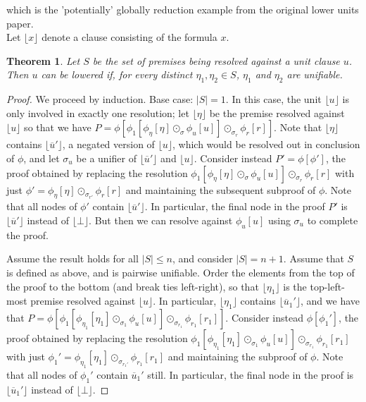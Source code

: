 \documentclass[12pt]{article}
\newtheorem{thm}{Theorem}[section]
\theoremstyle{definition}
\theoremstyle{remark}
\newcommand{\clause}[1]{ \lfloor{#1} \rfloor}
\begin{document}
which is the 'potentially' globally reduction example from the original lower units paper.\\


\newpage
Let $\clause{x}$ denote a clause consisting of the formula $x$.

\begin{thm}
Let $S$ be the set of premises being resolved against a unit clause $u$. Then $u$ can be lowered if, for every distinct $\eta_1,\eta_2 \in S$, $\eta_1$ and $\eta_2$ are unifiable.
\end{thm}

\begin{proof}
We proceed by induction. Base case: $|S|=1$. In this case, the unit $\clause{u}$ is only involved in exactly one resolution; let $\clause{\eta}$ be the premise resolved against $\clause{u}$ so that we have $P=\phi[\phi_1[\phi_\eta[\eta] \odot_{\sigma} \phi_u[u]] \odot_{\sigma_r}  \phi_r[r]]$. Note that $\clause{\eta}$ contains $\clause{\overline{u}'}$, a negated version of $\clause{u}$, which would be resolved out in conclusion of $\phi$, and let $\sigma_u$ be a unifier of $\clause{\overline{u}'}$ and $\clause{u}$. Consider instead $P'=\phi[\phi']$, the proof obtained by replacing the resolution $\phi_1[\phi_\eta[\eta] \odot_{\sigma} \phi_u[u]] \odot_{\sigma_r}  \phi_r[r]$ with just $\phi' = \phi_\eta[\eta] \odot_{\sigma_{r'}} \phi_r[r]$ and maintaining the subsequent subproof of $\phi$. Note that all nodes of $\phi'$ contain $\clause{\overline{u}'}$. In particular, the final node in the proof $P'$ is $\clause{\overline{u}'}$ instead of $\clause{\bot}$. But then we can resolve against $\phi_u[u]$ using $\sigma_u$ to complete the proof.

Assume the result holds for all $|S|\le n$, and consider $|S|=n+1$. Assume that $S$ is defined as above, and is pairwise unifiable. Order the elements from the top of the proof to the bottom (and break ties left-right), so that $\clause{\eta_1}$ is the top-left-most premise resolved against $\clause{u}$. In particular, $\clause{\eta_1}$ contains $\clause{\overline{u}_1'}$, and we have that $P=\phi[\phi_1[\phi_{\eta_1}[\eta_1] \odot_{\sigma_1} \phi_u[u]] \odot_{\sigma_{r_1}} \phi_{r_1}[r_1]]$. Consider instead $\phi[\phi_1']$, the proof obtained by replacing the resolution $\phi_1[\phi_{\eta_1}[\eta_1] \odot_{\sigma_1} \phi_u[u]] \odot_{\sigma_{r_1}} \phi_{r_1}[r_1]$ with just $\phi_1' = \phi_{\eta_1}[\eta_1] \odot_{\sigma_{r_1'}} \phi_{r_1}[r_1]$ and maintaining the subproof of $\phi$. Note that all nodes of $\phi_1'$ contain $\overline{u}_1'$ still. In particular, the final node in the proof is $\clause{\overline{u}_1'}$ instead of $\clause{\bot}$.  


\end{proof}
\end{document}
